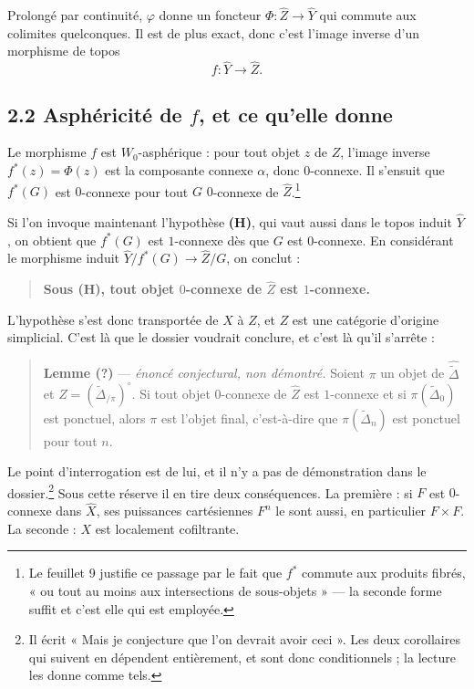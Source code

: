 \documentclass[11pt,a4paper]{article}
\begin{document}
Prolongé par continuité, $\varphi$ donne un foncteur
$\Phi : \widehat{Z} \to \widehat{Y}$ qui commute aux colimites quelconques. Il
est de plus exact, donc c'est l'image inverse d'un morphisme de topos
\[
  f : \widehat{Y} \longrightarrow \widehat{Z}.
\]

\subsection*{2.2 Asphéricité de $f$, et ce qu'elle donne}

Le morphisme $f$ est $W_{0}$-asphérique : pour tout objet $z$ de $Z$, l'image
inverse $f^{*}(z) = \Phi(z)$ est la composante connexe $\alpha$, donc
$0$-connexe. Il s'ensuit que $f^{*}(G)$ est $0$-connexe pour tout $G$
$0$-connexe de $\widehat{Z}$.\footnote{Le feuillet 9 justifie ce passage par
le fait que $f^{*}$ commute aux produits fibrés, « ou tout au moins aux
intersections de sous-objets » — la seconde forme suffit et c'est elle qui
est employée.}

Si l'on invoque maintenant l'hypothèse \textbf{(H)}, qui vaut aussi dans le
topos induit $\widehat{Y}$, on obtient que $f^{*}(G)$ est $1$-connexe dès que
$G$ est $0$-connexe. En considérant le morphisme induit
$\widehat{Y}/f^{*}(G) \to \widehat{Z}/G$, on conclut :

\begin{quote}
\textbf{Sous (H), tout objet $0$-connexe de $\widehat{Z}$ est $1$-connexe.}
\end{quote}

L'hypothèse s'est donc transportée de $X$ à $Z$, et $Z$ est une catégorie
d'origine simplicial. C'est là que le dossier voudrait conclure, et c'est là
qu'il s'arrête :

\begin{quote}
\textbf{Lemme (?)} — \emph{énoncé conjectural, non démontré.} Soient $\pi$ un
objet de $\widehat{\widetilde{\Delta}}$ et
$Z = (\widetilde{\Delta}_{/\pi})^{\circ}$. Si tout objet $0$-connexe de
$\widehat{Z}$ est $1$-connexe et si $\pi(\widetilde{\Delta}_{0})$ est
ponctuel, alors $\pi$ est l'objet final, c'est-à-dire que
$\pi(\widetilde{\Delta}_{n})$ est ponctuel pour tout $n$.
\end{quote}

Le point d'interrogation est de lui, et il n'y a pas de démonstration dans le
dossier.\footnote{Il écrit « Mais je conjecture que l'on devrait avoir
ceci ». Les deux corollaires qui suivent en dépendent entièrement, et sont
donc conditionnels ; la lecture les donne comme tels.} Sous cette réserve il
en tire deux conséquences. La première : si $F$ est $0$-connexe dans
$\widehat{X}$, ses puissances cartésiennes $F^{n}$ le sont aussi, en
particulier $F \times F$. La seconde : $X$ est localement cofiltrante.
\end{document}

